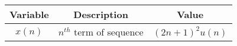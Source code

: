 
      \begin{tabular}{|c|c|c|} 
      \hline
\textbf{Variable}& \textbf{Description}& \textbf{Value}\\\hline
         $x(n)$& $n^{th}$ term of sequence& $(2n+1)^2u(n)$\\\hline
          
    \end{tabular}

